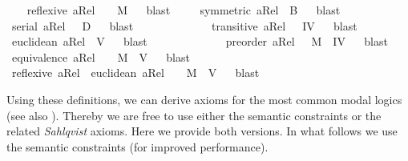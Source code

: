 \begin{isabellebody}
\ \ \isamarkupfalse%
\ {\isachardoublequoteopen}reflexive\ aRel\ \ {\isasymLongrightarrow}\ \ {\isasymlfloor}M{\isasymrfloor}{\isachardoublequoteclose}%
\ %
%
\isamarkupfalse%
\ blast\ %
%
%
%
\isanewline
\ \ \isamarkupfalse%
\ {\isachardoublequoteopen}symmetric\ aRel\ {\isasymLongrightarrow}\ {\isasymlfloor}B{\isasymrfloor}{\isachardoublequoteclose}%
\ %
%
\isamarkupfalse%
\ blast%
%
%
\isanewline
\ \ \isamarkupfalse%
\ {\isachardoublequoteopen}serial\ aRel\ \ {\isasymLongrightarrow}\ {\isasymlfloor}D{\isasymrfloor}{\isachardoublequoteclose}%
\ %
%
\isamarkupfalse%
\ blast%
%
%
\ \ \ \ \ \ \ \ \ \isanewline
\ \ \isamarkupfalse%
\ {\isachardoublequoteopen}transitive\ aRel\ \ {\isasymLongrightarrow}\ {\isasymlfloor}IV{\isasymrfloor}{\isachardoublequoteclose}%
\ %
%
\isamarkupfalse%
\ blast%
%
%
\ \ \ \isanewline
\ \ \isamarkupfalse%
\ {\isachardoublequoteopen}euclidean\ aRel\ {\isasymLongrightarrow}\ {\isasymlfloor}V{\isasymrfloor}{\isachardoublequoteclose}%
\ %
%
\isamarkupfalse%
\ blast%
%
%
\ \ \ \ \ \ \ \ \ \isanewline
\ \ \isamarkupfalse%
\ {\isachardoublequoteopen}preorder\ aRel\ {\isasymLongrightarrow}\ \ {\isasymlfloor}M{\isasymrfloor}\ {\isasymand}\ {\isasymlfloor}IV{\isasymrfloor}{\isachardoublequoteclose}%
\ %
%
\isamarkupfalse%
\ blast\ %
%
%
%
\isanewline
\ \ \isamarkupfalse%
\ {\isachardoublequoteopen}equivalence\ aRel\ \ {\isasymLongrightarrow}\ \ {\isasymlfloor}M{\isasymrfloor}\ {\isasymand}\ {\isasymlfloor}V{\isasymrfloor}{\isachardoublequoteclose}%
\ %
%
\isamarkupfalse%
\ blast\ %
%
%
%
\isanewline
\ \ \isamarkupfalse%
\ {\isachardoublequoteopen}reflexive\ aRel\ {\isasymand}\ euclidean\ aRel\ \ {\isasymLongrightarrow}\ \ {\isasymlfloor}M{\isasymrfloor}\ {\isasymand}\ {\isasymlfloor}V{\isasymrfloor}{\isachardoublequoteclose}%
\ %
%
\isamarkupfalse%
\ blast\ %
%
%
%
%
\begin{isamarkuptext}%
Using these definitions, we can derive axioms for the most common modal logics (see also \cite{C47}). 
  Thereby we are free to use either the semantic constraints or the related \emph{Sahlqvist} axioms. Here we provide 
  both versions. In what follows we use the semantic constraints (for improved performance).%
\end{isamarkuptext}\isamarkuptrue%

\end{isabellebody}
